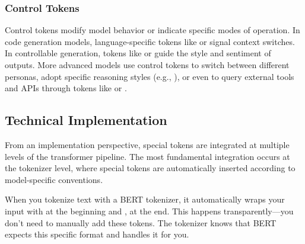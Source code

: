\subsubsection{Control Tokens}
Control tokens modify model behavior or indicate specific modes of operation. In code generation models, language-specific tokens like  or  signal context switches. In controllable generation, tokens like  or  guide the style and sentiment of outputs. More advanced models use control tokens to switch between different personas, adopt specific reasoning styles (e.g., ), or even to query external tools and APIs through tokens like  or .
\begin{comment}
Feedback: The "Control Tokens" section is a great place to highlight the power and flexibility of special tokens. The examples are good. You could make this even more impactful by mentioning a more advanced or surprising example, if one exists. For instance, "More advanced models use control tokens to switch between different personas, adopt a specific reasoning style (e.g., chain-of-thought), or even to query external tools and APIs." This hints at the cutting-edge applications.

STATUS: addressed - added advanced examples including persona switching, reasoning styles, and tool querying capabilities
\end{comment}

\subsection{Technical Implementation}

From an implementation perspective, special tokens are integrated at multiple levels of the transformer pipeline. The most fundamental integration occurs at the tokenizer level, where special tokens are automatically inserted according to model-specific conventions.

When you tokenize text with a BERT tokenizer, it automatically wraps your input with \cls{} at the beginning and \sep{} at the end. This happens transparently—you don't need to manually add these tokens. The tokenizer knows that BERT expects this specific format and handles it for you.

